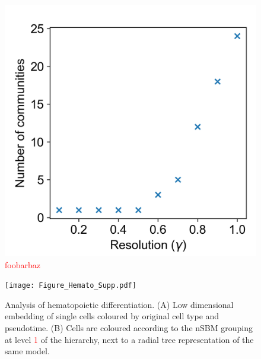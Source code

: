 \documentclass[11pt, titlepage, twoside]{article}
\begin{document}
\begin{figure}[htbp]
\centering
\includegraphics[keepaspectratio,width=\textwidth,height=0.375\textheight]{Random_Leiden_by_gamma.png}
\caption[]{\textcolor{red}{foobarbaz}}
\label{Modularity_Random_Res}
\end{figure}
\clearpage



\begin{figure}[htbp]
\centering
\texttt{[image: Figure\_Hemato\_Supp.pdf]}
\caption[]{Analysis of hematopoietic differentiation. (A) Low dimensional embedding of single cells coloured by original cell type and pseudotime. (B) Cells are coloured according to the nSBM grouping at level \textcolor{red}{1} of the hierarchy, next to a radial tree representation of the same model.}\label{Figure_Hemato_Supp}
\end{figure}
\clearpage
\end{document}
